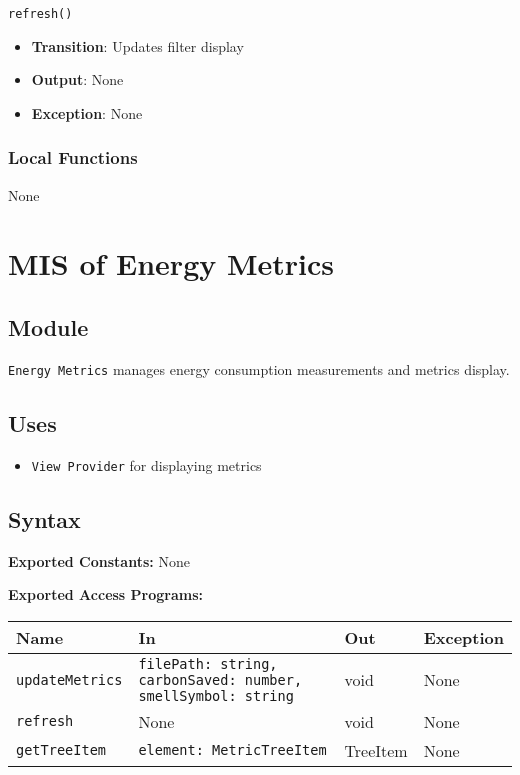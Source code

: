 \documentclass[12pt, titlepage]{article}
\begin{document}
\texttt{refresh()}
\begin{itemize}
\item \textbf{Transition}: Updates filter display
\item \textbf{Output}: None
\item \textbf{Exception}: None
\end{itemize}

\subsubsection{Local Functions}
None

\section{MIS of Energy Metrics}

\subsection{Module}
\texttt{Energy Metrics} manages energy consumption measurements and metrics display.

\subsection{Uses}
\begin{itemize}
\item \texttt{View Provider} for displaying metrics
\end{itemize}

\subsection{Syntax}

\textbf{Exported Constants:} None

\textbf{Exported Access Programs:}\\
\begin{tabularx}{\linewidth}{|l|>{\raggedright\arraybackslash}X|l|l|}
  \hline
  \textbf{Name} & \textbf{In} & \textbf{Out} & \textbf{Exception} \\
  \hline
  \texttt{updateMetrics} & \texttt{filePath: string, carbonSaved: number, smellSymbol: string} & void & None \\ \hline
  \texttt{refresh} & None & void & None \\ \hline
  \texttt{getTreeItem} & \texttt{element: MetricTreeItem} & TreeItem & None \\
  \hline
\end{tabularx}
\end{document}
